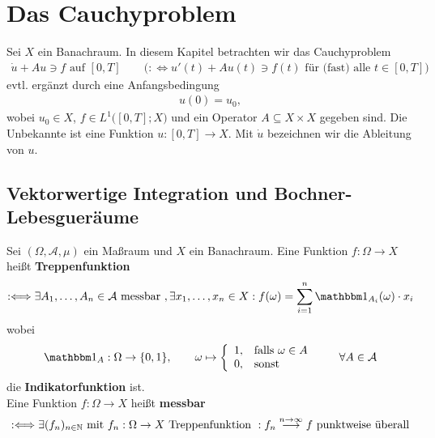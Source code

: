 
\chapter{Das Cauchyproblem}
Sei $X$ ein Banachraum. In diesem Kapitel betrachten wir das Cauchyproblem
\begin{align}\label{CauchyProblem}\tag{CP}
	\dot{u}+Au\ni f\text{ auf }[0,T] \qquad\Big(:\Longleftrightarrow u'(t)+A u(t)\ni f(t)\text{ für (fast) alle }t\in[0,T]\Big)
\end{align}
evtl. ergänzt durch eine Anfangsbedingung
\begin{align*}
	u(0)=u_0,
\end{align*}
wobei $u_0\in X$, $f\in L^1\big([0,T];X\big)$ und ein Operator $A\subseteq X\times X$ gegeben sind. 
Die Unbekannte ist eine Funktion $u:[0,T]\to X$. 
Mit $\dot{u}$ bezeichnen wir die Ableitung von $u$.

\section{Vektorwertige Integration und Bochner-Lebesgueräume}
\begin{definition}
	Sei $(\Omega,\mathcal{A},\mu)$ ein Maßraum und $X$ ein Banachraum. 
	Eine Funktion $f:\Omega\to X$ heißt \textbf{Treppenfunktion}
	\begin{align*}
		:\Longleftrightarrow\exists A_1,\ldots,A_n\in\mathcal{A}\text{ messbar },\exists x_1,\ldots,x_n\in X:f(\omega)=\sum\limits_{i=1}^n\indi_{A_i}(\omega)\cdot x_i
	\end{align*}
	wobei
	\begin{align*}
		\indi_A:\Omega\to\lbrace0,1\rbrace,\qquad\omega\mapsto\left\lbrace\begin{array}{cl}
			1, & \falls \omega\in A\\
			0, & \sonst
		\end{array}\right.\qquad\forall A\in\mathcal{A}
	\end{align*}
	die \textbf{Indikatorfunktion} ist.\\
	Eine Funktion $f:\Omega\to X$ heißt \textbf{messbar}
	\begin{align*}
		:\Longleftrightarrow\exists(f_n)_{n\in\mathbb{N}}\text{ mit $f_n:\Omega\to X$ Treppenfunktion }:f_n\stackrel{n\to\infty}{\longrightarrow} f\text{ punktweise überall}
	\end{align*}
\end{definition}

